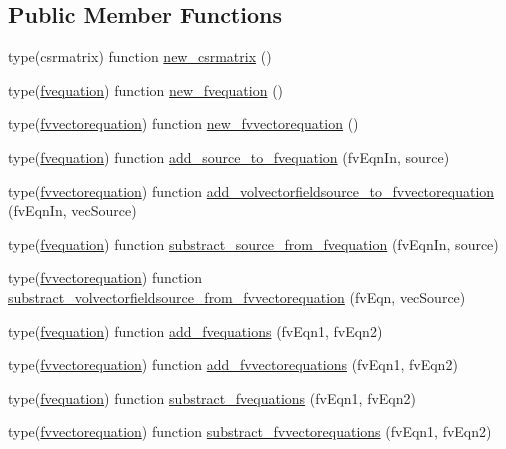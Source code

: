 \subsection*{Public Member Functions}
\begin{DoxyCompactItemize}
\item 
type(csrmatrix) function \hyperlink{classfv__equation_a6cdef646079ec69baf08f18aba78f6a9}{new\-\_\-csrmatrix} ()
\item 
type(\hyperlink{structfv__equation_1_1fvequation}{fvequation}) function \hyperlink{classfv__equation_a26481f97d53ea82c43a66a0b31e73a4e}{new\-\_\-fvequation} ()
\item 
type(\hyperlink{structfv__equation_1_1fvvectorequation}{fvvectorequation}) function \hyperlink{classfv__equation_ab46a4f94deb0186ea0798d62c34f2cae}{new\-\_\-fvvectorequation} ()
\item 
type(\hyperlink{structfv__equation_1_1fvequation}{fvequation}) function \hyperlink{classfv__equation_a642df53156dacdf9e8cfb78a4a80afbc}{add\-\_\-source\-\_\-to\-\_\-fvequation} (fv\-Eqn\-In, source)
\item 
type(\hyperlink{structfv__equation_1_1fvvectorequation}{fvvectorequation}) function \hyperlink{classfv__equation_a1cd42802fcacf44f5388489bd3df7c67}{add\-\_\-volvectorfieldsource\-\_\-to\-\_\-fvvectorequation} (fv\-Eqn\-In, vec\-Source)
\item 
type(\hyperlink{structfv__equation_1_1fvequation}{fvequation}) function \hyperlink{classfv__equation_ad6aa7075e57df58366c29f5015c0865e}{substract\-\_\-source\-\_\-from\-\_\-fvequation} (fv\-Eqn\-In, source)
\item 
type(\hyperlink{structfv__equation_1_1fvvectorequation}{fvvectorequation}) function \hyperlink{classfv__equation_a3d4afbd5ad280d482ba99f117913ecd4}{substract\-\_\-volvectorfieldsource\-\_\-from\-\_\-fvvectorequation} (fv\-Eqn, vec\-Source)
\item 
type(\hyperlink{structfv__equation_1_1fvequation}{fvequation}) function \hyperlink{classfv__equation_a0097d3c782d694764ed35de4b8846746}{add\-\_\-fvequations} (fv\-Eqn1, fv\-Eqn2)
\item 
type(\hyperlink{structfv__equation_1_1fvvectorequation}{fvvectorequation}) function \hyperlink{classfv__equation_adde0fa2f08474e2a33743d27a38cd813}{add\-\_\-fvvectorequations} (fv\-Eqn1, fv\-Eqn2)
\item 
type(\hyperlink{structfv__equation_1_1fvequation}{fvequation}) function \hyperlink{classfv__equation_ab635143c726e64626d65e59962cd4f5e}{substract\-\_\-fvequations} (fv\-Eqn1, fv\-Eqn2)
\item 
type(\hyperlink{structfv__equation_1_1fvvectorequation}{fvvectorequation}) function \hyperlink{classfv__equation_a7da2e0fbfe99bc1e49cc62c9a970ba48}{substract\-\_\-fvvectorequations} (fv\-Eqn1, fv\-Eqn2)
\end{DoxyCompactItemize}


